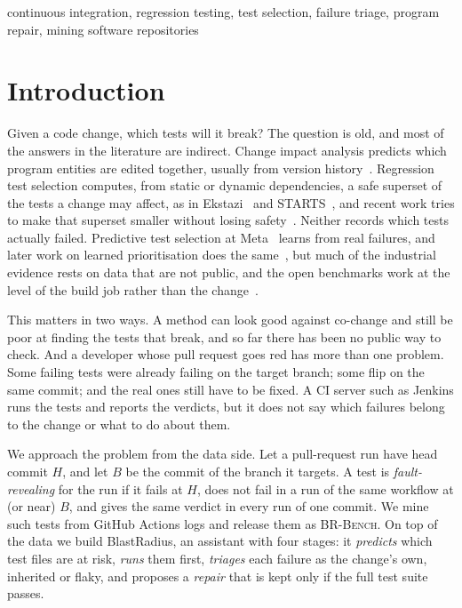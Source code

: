 \documentclass[10pt,conference]{IEEEtran}
\newcommand{\brb}{\textsc{BR-Bench}}
\begin{document}
\begin{IEEEkeywords}
continuous integration, regression testing, test selection, failure triage, program repair, mining software repositories
\end{IEEEkeywords}

\section{Introduction}

Given a code change, which tests will it break? The question is old, and most of the answers in the literature are indirect. Change impact analysis predicts which program entities are edited together, usually from version history~\cite{huang2022change}. Regression test selection computes, from static or dynamic dependencies, a safe superset of the tests a change may affect, as in Ekstazi~\cite{gligoric2015practical} and STARTS~\cite{legunsen2017starts}, and recent work tries to make that superset smaller without losing safety~\cite{liu2023more}. Neither records which tests actually failed. Predictive test selection at Meta~\cite{machalica2019predictive} learns from real failures, and later work on learned prioritisation does the same~\cite{pan2022test,yaraghi2022scalable}, but much of the industrial evidence rests on data that are not public, and the open benchmarks work at the level of the build job rather than the change~\cite{mattis2020rtptorrent}.

This matters in two ways. A method can look good against co-change and still be poor at finding the tests that break, and so far there has been no public way to check. And a developer whose pull request goes red has more than one problem. Some failing tests were already failing on the target branch; some flip on the same commit; and the real ones still have to be fixed. A CI server such as Jenkins runs the tests and reports the verdicts, but it does not say which failures belong to the change or what to do about them.

We approach the problem from the data side. Let a pull-request run have head commit $H$, and let $B$ be the commit of the branch it targets. A test is \emph{fault-revealing} for the run if it fails at $H$, does not fail in a run of the same workflow at (or near) $B$, and gives the same verdict in every run of one commit. We mine such tests from GitHub Actions logs and release them as \brb{}. On top of the data we build BlastRadius, an assistant with four stages: it \emph{predicts} which test files are at risk, \emph{runs} them first, \emph{triages} each failure as the change's own, inherited or flaky, and proposes a \emph{repair} that is kept only if the full test suite passes.
\end{document}
